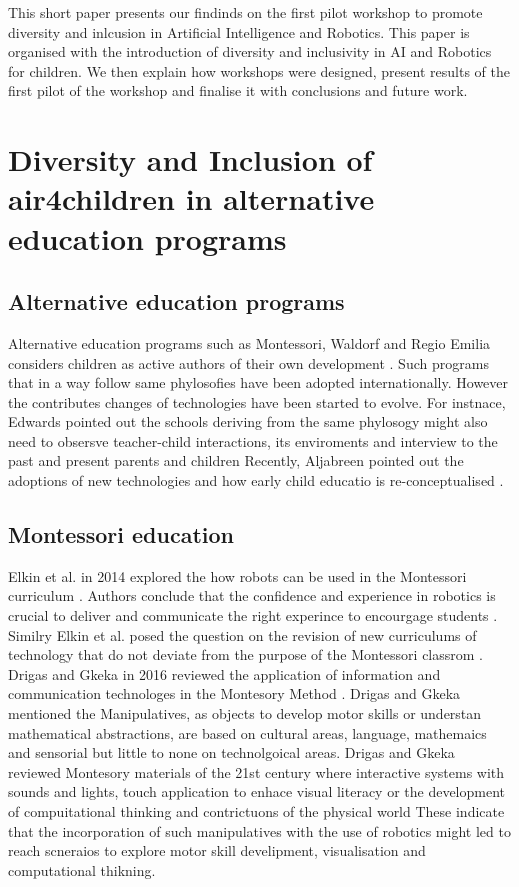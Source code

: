 \documentclass[conference]{IEEEtran}
\begin{document}
This short paper presents our findinds on the first pilot workshop to promote diversity and inlcusion in Artificial Intelligence and Robotics.
This paper is organised with the introduction of diversity and inclusivity in AI and Robotics for children. 
We then explain how workshops were designed, present results of the first pilot of the workshop and finalise it with conclusions and future work.

\section{Diversity and Inclusion of air4children in alternative education programs}

\subsection{Alternative education programs}
Alternative education programs such as Montessori, Waldorf and Regio Emilia considers children as active authors of their own development \cite{edwards2002}.
Such programs that in a way follow same phylosofies have been adopted internationally.
However the contributes changes of technologies have been started to evolve. 
For instnace, Edwards pointed out the schools deriving from the same phylosogy might also need to obsersve teacher-child interactions, its enviroments and interview to the past and present parents and children \cite{edwards2002}
Recently, Aljabreen pointed out the adoptions of new technologies and how early child educatio is re-conceptualised \cite{Aljabreen2020}.

\subsection{Montessori education}
Elkin et al. in 2014 explored the how robots can be used in the Montessori curriculum \cite{elkin2014}.
Authors conclude that the confidence and experience in robotics is crucial to deliver and communicate the right experince to encourgage students \cite{elkin2014}.
Similry Elkin et al. posed the question on the revision of new curriculums of technology that do not deviate from the purpose of the Montessori classrom \cite{elkin2014}.
Drigas and Gkeka in 2016 reviewed the application of information and communication technologes in the Montesory Method \cite{DrigasGkeka2016}.
Drigas and Gkeka mentioned the Manipulatives, as objects to develop motor skills or understan mathematical abstractions, are based on cultural areas, language, mathemaics and sensorial but little to none on technolgoical areas.
Drigas and Gkeka reviewed Montesory materials of the 21st century where interactive systems with sounds and lights, touch application to enhace visual literacy or the development of compuitational thinking and contrictuons of the physical world \cite{DrigasGkeka2016}
These indicate that the incorporation of such manipulatives with the use of robotics might led to reach scneraios to explore motor skill develipment, visualisation and computational thikning. 
\end{document}
